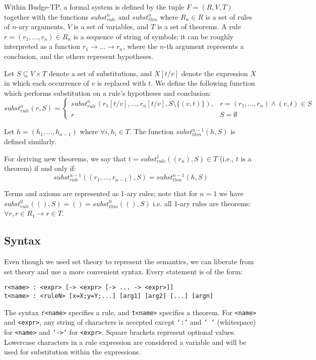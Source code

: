 \documentclass{article}
\begin{document}
Within Budge-TP, a formal system is defined by the tuple $F = (R, V, T)$ together with the functions $subst_{rule}^n$ and $subst_{thm}^n$ where $R_n \in R$ is a set of rules of $n$-ary arguments, $V$ is a set of variables, and $T$ is a set of theorems. A rule $r = (r_1, \ldots, r_n) \in R_n$ is a sequence of string of symbols; it can be roughly interpreted as a function $r_1 \to \ldots \to r_n$, where the $n$-th argument represents a conclusion, and the others represent hypotheses.

Let $S \subseteq V \times T$ denote a set of substitutions, and $X[t/v]$ denote the expression $X$ in which each occurrence of $v$ is replaced with $t$. We define the following function which performs substitution on a rule's hypotheses and conclusion:
$$ subst_{rule}^n(r, S) = {
\begin{cases}
subst_{rule}^n(r_1[t/v], \ldots, r_n[t/v], S \setminus \{(v, t) \}), & r = (r_1, \ldots, r_n) \land (v, t) \in S \\
r & S = \emptyset
\end{cases}}
$$

Let $h = (h_1, \ldots, h_{n-1})$ where $\forall i, h_i \in T$. The function $subst_{thm}^{n-1}(h, S)$ is defined similarly.

For deriving new theorems, we say that $t = subst_{rule}^1((r_n), S) \in T$ (i.e., $t$ is a theorem) if and only if:
$$subst_{rule}^{n-1}((r_1, \ldots, r_{n-1}), S) = subst_{thm}^{n-1}(h, S)$$

Terms and axioms are represented as 1-ary rules; note that for $n = 1$ we have $subst_{rule}^0((), S) = () = subst_{thm}^0((), S)$ i.e. all 1-ary rules are theorems: $\forall r, r \in R_1 \to r \in T$.

\subsection{Syntax}

Even though we used set theory to represent the semantics, we can liberate from set theory and use a more convenient syntax. Every statement is of the form:

\begin{verbatim}
r<name> : <expr> [-> <expr> [-> ... -> <expr>]]
t<name> : <ruleN> [x=X;y=Y;...] [arg1] [arg2] [...] [argn]
\end{verbatim}

The syntax \texttt{r<name>} specifies a rule, and \texttt{t<name>} specifies a theorem. For \texttt{<name>} and \texttt{<expr>}, any string of characters is accepted except \texttt{':'} and \texttt{' '} (whitespace) for \texttt{<name>} and \texttt{'->'} for \texttt{<expr>}. Square brackets represent optional values. Lowercase characters in a rule expression are considered a variable and will be used for substitution within the expressions.
\end{document}
